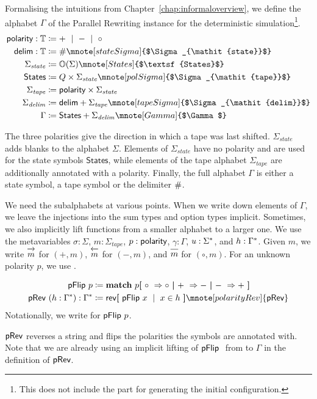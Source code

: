 Formalising the intuitions from Chapter~\ref{chap:informaloverview}, we define the alphabet $\Gamma$ of the Parallel Rewriting instance for the deterministic simulation\footnote{This does not include the part for generating the initial configuration.}.
\newcommand{\stateSigma}{\Sigma_{\mathit{state}}}%
\newcommand{\delimSigma}{\Sigma_{\mathit{delim}}}%
\newcommand{\tapeSigma}{\Sigma_{\mathit{tape}}}%
\newcommand{\States}{\textsf{States}}%
%
\begin{align*}
  \polarity : \Type &\defeq + \bnfmid - \bnfmid \circ \\
  \textsf{delim} : \Type &\defeq \# \mnote[stateSigma]{$\stateSigma$}\\
  \stateSigma &\defeq \opt{\Sigma} \mnote[States]{$\States$}\\
  \States &\defeq Q \times \stateSigma \mnote[polSigma]{$\tapeSigma$}\\
  \tapeSigma &\defeq \polarity \times \stateSigma \\
  \delimSigma &\defeq \textsf{delim} + \tapeSigma \mnote[tapeSigma]{$\delimSigma$}\\
  \Gamma &\defeq \States + \delimSigma
  \mnote[Gamma]{$\Gamma$}
\end{align*}

The three polarities give the direction in which a tape was last shifted. $\stateSigma$ adds blanks to the alphabet $\Sigma$. Elements of $\stateSigma$ have no polarity and are used for the state symbols $\States$, while elements of the tape alphabet $\tapeSigma$ are additionally annotated with a polarity. Finally, the full alphabet $\Gamma$ is either a state symbol, a tape symbol or the delimiter $\#$. 

We need the subalphabets at various points. When we write down elements of $\Gamma$, we leave the injections into the sum types and option types implicit. Sometimes, we also implicitly lift functions from a smaller alphabet to a larger one.
We use the metavariables $\sigma : \Sigma$, $m : \tapeSigma$, $p : \textsf{polarity}$, $\gamma : \Gamma$, $u : \Sigma^*$, and $h : \Gamma^*$. 
Given $m$, we write $\polpos{m}$ for $(+, m)$, $\polneg{m}$ for $(-, m)$, and $\polneut{m}$ for $(\circ, m)$. For an unknown polarity $p$, we use .

\begin{definition}
  \begin{align*}
    \pFlip{p} &\defeq \match p \withl \circ~\Rightarrow \circ \withm +~\Rightarrow - \withm -~\Rightarrow +\withr \\
    \pRev~(h : \str{\Gamma}) : \str{\Gamma} &\defeq \rev{\withl\pFlip{x} \bnfmid x \in h\withr}
    \mnote[polarityRev]{\pRev}
  \end{align*}
  Notationally, we write  for $\textsf{pFlip}~p$. 
\end{definition}
$\textsf{pRev}$ reverses a string and flips the polarities the symbols are annotated with.
Note that we are already using an implicit lifting of $\textsf{pFlip}~$ from \polarity{} to $\Gamma$ in the definition of $\textsf{pRev}$. 

